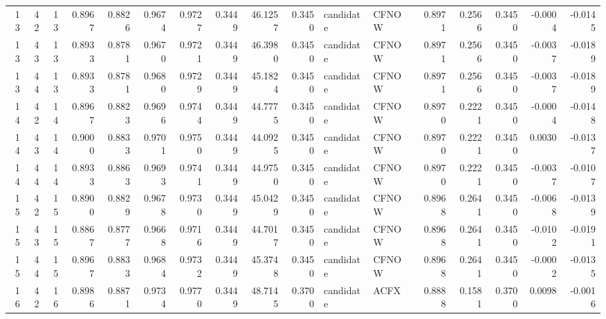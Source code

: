 \begin{tabular}{rrrrrrrrrrllrrrrr}
 13 &    42 &           13 &  0.8967 &   0.8826 &     0.9674 &      0.9727 &           0.3449 &      46.1257 &  0.3450 & candidate &  CFNOW &          0.8971 &               0.2566 &                     0.3450 &  -0.0004 &   -0.0145 \\
 13 &    43 &           13 &  0.8933 &   0.8781 &     0.9670 &      0.9721 &           0.3449 &      46.3980 &  0.3450 & candidate &  CFNOW &          0.8971 &               0.2566 &                     0.3450 &  -0.0037 &   -0.0189 \\
 13 &    44 &           13 &  0.8933 &   0.8781 &     0.9680 &      0.9729 &           0.3449 &      45.1824 &  0.3450 & candidate &  CFNOW &          0.8971 &               0.2566 &                     0.3450 &  -0.0037 &   -0.0189 \\
 14 &    42 &           14 &  0.8967 &   0.8823 &     0.9696 &      0.9744 &           0.3449 &      44.7775 &  0.3450 & candidate &  CFNOW &          0.8970 &               0.2221 &                     0.3450 &  -0.0004 &   -0.0148 \\
 14 &    43 &           14 &  0.9000 &   0.8833 &     0.9701 &      0.9750 &           0.3449 &      44.0925 &  0.3450 & candidate &  CFNOW &          0.8970 &               0.2221 &                     0.3450 &   0.0030 &   -0.0137 \\
 14 &    44 &           14 &  0.8933 &   0.8863 &     0.9693 &      0.9741 &           0.3449 &      44.9750 &  0.3450 & candidate &  CFNOW &          0.8970 &               0.2221 &                     0.3450 &  -0.0037 &   -0.0107 \\
 15 &    42 &           15 &  0.8900 &   0.8829 &     0.9678 &      0.9730 &           0.3449 &      45.0429 &  0.3450 & candidate &  CFNOW &          0.8968 &               0.2641 &                     0.3450 &  -0.0068 &   -0.0139 \\
 15 &    43 &           15 &  0.8867 &   0.8777 &     0.9668 &      0.9716 &           0.3449 &      44.7017 &  0.3450 & candidate &  CFNOW &          0.8968 &               0.2641 &                     0.3450 &  -0.0102 &   -0.0191 \\
 15 &    44 &           15 &  0.8967 &   0.8833 &     0.9684 &      0.9732 &           0.3449 &      45.3748 &  0.3450 & candidate &  CFNOW &          0.8968 &               0.2641 &                     0.3450 &  -0.0002 &   -0.0135 \\
 16 &    42 &           16 &  0.8986 &   0.8871 &     0.9734 &      0.9770 &           0.3449 &      48.7145 &  0.3700 & candidate &   ACFX &          0.8888 &               0.1581 &                     0.3700 &   0.0098 &   -0.0016 \\

\end{tabular}
